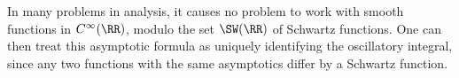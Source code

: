\begin{remark}
    In many problems in analysis, it causes no problem to work with smooth functions in $C^\infty(\RR)$, modulo the set $\SW(\RR)$ of Schwartz functions. One can then treat this asymptotic formula as uniquely identifying the oscillatory integral, since any two functions with the same asymptotics differ by a Schwartz function.
\end{remark}

